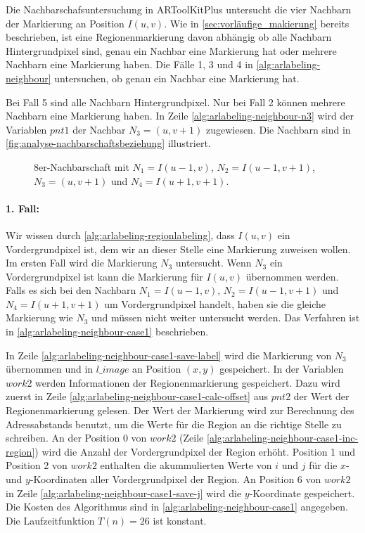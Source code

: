 Die Nachbarschafsuntersuchung in ARToolKitPlus untersucht die vier Nachbarn der Markierung an Position $I(u,v)$. Wie in
 \autoref{sec:vorläufige_makierung} bereits beschrieben, ist eine Regionenmarkierung davon abhängig ob alle Nachbarn
 Hintergrundpixel sind, genau ein Nachbar eine Markierung hat oder mehrere Nachbarn eine Markierung haben. Die Fälle
 1, 3 und 4 in \autoref{alg:arlabeling-neighbour} untersuchen, ob genau ein Nachbar eine Markierung hat.

Bei Fall 5 sind alle Nachbarn Hintergrundpixel. Nur bei Fall 2 können  mehrere Nachbarn eine Markierung haben. In Zeile
 \ref{alg:arlabeling-neighbour-n3} wird der Variablen $\mathit{pnt1}$ der Nachbar $N_3 = (u,v+1)$ zugewiesen. Die
 Nachbarn sind in \autoref{fig:analyse-nachbarschaftsbeziehung} illustriert.
\begin{figure}[!ht]
	\centering
	
	\caption{8er-Nachbarschaft mit $N_1 = I(u-1,v)$, $N_2 = I(u-1,v+1)$, $N_3 = (u,v+1)$ und $N_4 = I(u+1,v+1)$.}
	\label{fig:analyse-nachbarschaftsbeziehung}
\end{figure}
\paragraph{1. Fall:} %
\label{par:fall_1_}
Wir wissen durch \autoref{alg:arlabeling-regionlabeling}, dass $I(u,v)$ ein Vordergrundpixel ist, dem wir an dieser
 Stelle eine Markierung zuweisen wollen. Im ersten Fall wird die Markierung $N_3$ untersucht. Wenn $N_3$ ein
 Vordergrundpixel ist kann die Markierung für $I(u,v)$ übernommen werden. Falls es sich bei den Nachbarn
 $N_1 = I(u-1,v)$, $N_2 = I(u-1,v+1)$ und $N_4 = I(u+1,v+1)$ um Vordergrundpixel handelt, haben sie die gleiche
 Markierung wie $N_3$ und müssen nicht weiter untersucht werden. Das Verfahren ist in
 \autoref{alg:arlabeling-neighbour-case1} beschrieben.

In Zeile \ref{alg:arlabeling-neighbour-case1-save-label} wird die Markierung von $N_3$ übernommen und in
 $\mathit{l\_image}$ an Position $(x,y)$ gespeichert. In der Variablen $\mathit{work2}$ werden Informationen der
 Regionenmarkierung gespeichert. Dazu wird zuerst in Zeile \ref{alg:arlabeling-neighbour-case1-calc-offset} aus
 $\mathit{pnt2}$ der Wert der Regionenmarkierung gelesen. Der Wert der Markierung wird zur Berechnung des
 Adressabstands benutzt, um die Werte für die Region an die richtige Stelle zu schreiben. An der Position $0$ von
 $\mathit{work2}$ (Zeile \ref{alg:arlabeling-neighbour-case1-inc-region}) wird die Anzahl der Vordergrundpixel der
 Region erhöht. Position 1 und Position 2 von $\mathit{work2}$ enthalten die akummulierten Werte von $i$ und $j$ für
 die $x$- und $y$-Koordinaten aller Vordergrundpixel der Region. An Position 6 von $\mathit{work2}$ in Zeile
 \ref{alg:arlabeling-neighbour-case1-save-j} wird die $y$-Koordinate gespeichert. Die Kosten des Algorithmus sind in
 \autoref{alg:arlabeling-neighbour-case1} angegeben. Die Laufzeitfunktion $T(n) = 26$ ist konstant.

